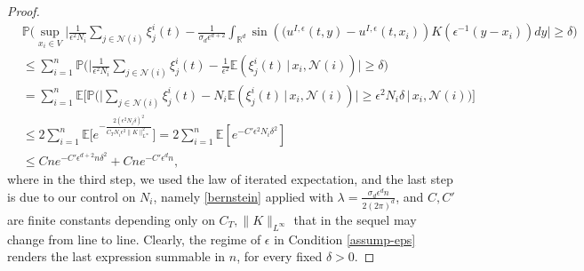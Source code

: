 \documentclass[a4paper,11pt]{amsart}
\newcommand{\E}{\mathbb{E}}
\renewcommand{\P}{\mathbb{P}}
\newcommand{\R}{\mathbb{R}}
\newcommand{\ep}{\epsilon}
\newcommand{\cN}{\mathcal{N}}
\numberwithin{equation}{section}
\numberwithin{theorem}{section}
\theoremstyle{definition}
\begin{document}
\begin{proof}
\begin{align}\label{bound-fixed-t}
&\P\Big(\sup_{x_i\in V}\Big|\frac{1}{\ep^2N_i}\sum_{j\in\cN(i)}\xi_j^i(t)-\frac{1}{\sigma_d \ep^{d+2}}\int_{\R^d}\sin\left((u^{I,\ep}(t,y)-u^{I,\ep}(t,x_i)\right)K\left({\ep}^{-1}{(y-x_i)}\right)dy\Big|\ge \delta\Big)\nonumber\\
&\le\sum_{i=1}^n\P\Big(\Big|\frac{1}{\ep^2N_i}\sum_{j\in\cN(i)}\xi_j^i(t)-\frac{1}{\ep^2}\E\left(\xi_j^i(t)\,|\, x_i, \cN(i)\right)\Big|\ge \delta\Big)\nonumber\\
&=\sum_{i=1}^n\E\Big[\P\Big(\Big|\sum_{j\in\cN(i)}\xi_j^i(t)-N_i\E\left(\xi_j^i(t)\,|\, x_i, \cN(i)\right)\Big|\ge \ep^2N_i\delta\, \Big|\, x_i, \cN(i)\Big)\Big] \nonumber\\
&\le 2\sum_{i=1}^n \E\Big[ e^{-\frac{2(\ep^2N_i\delta)^2}{C_TN_i\ep^2\|K\|_{L^\infty}^2}}\Big] =2\sum_{i=1}^n \E \left[e^{-C'\ep^2 N_i \delta^2}\right] \nonumber\\
&\le Cne^{-C'\ep^{d+2} n \delta^2}+Cne^{-C'\ep^dn},
\end{align}
where in the third step, we used the law of iterated expectation, and the last step is due to our control on $N_i$, namely \eqref{bernstein} applied with $\lambda=\frac{\sigma_d\ep^dn}{2(2\pi)^d}$, and $C,C'$ are finite constants depending only on $C_T,  \|K\|_{L^\infty}$ that in the sequel may change from line to line. Clearly, the regime of $\ep$ in Condition \ref{assump-eps} renders the last expression summable in $n$, for every fixed $\delta>0$.


\end{proof}
\end{document}
